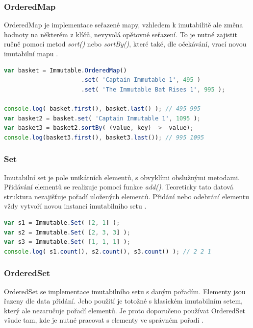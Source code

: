 \subsubsection{OrderedMap}
OrderedMap je implementace seřazené mapy, vzhledem k imutabilitě ale změna hodnoty na některém z klíčů, nevyvolá opětovné seřazení. To je nutné zajistit ručně pomocí metod \textit{sort()} nebo \textit{sortBy()}, které také, dle očekávání, vrací novou imutabilní mapu \cite{immutablejs} \cite{immutablejs_learn}.
\begin{lstlisting}[language=Javascript,caption={Ukázka práce s imutabilními seřazenými mapami v immutable.js}]
var basket = Immutable.OrderedMap()
                      .set( 'Captain Immutable 1', 495 )
                      .set( 'The Immutable Bat Rises 1', 995 );

console.log( basket.first(), basket.last() ); // 495 995
var basket2 = basket.set( 'Captain Immutable 1', 1095 );
var basket3 = basket2.sortBy( (value, key) -> -value); 
console.log(basket3.first(), basket3.last()); // 995 1095
\end{lstlisting}

\subsubsection{Set}
Imutabilní set je pole unikátních elementů, s obvyklími obslužnými metodami. Přidávání elementů se realizuje pomocí funkce \textit{add()}. Teoreticky tato datová struktura nezajišťuje pořadí uložených elementů. Přidání nebo odebrání elementu vždy vytvoří novou instanci imutabilního setu \cite{immutablejs} \cite{immutablejs_learn}.

\begin{lstlisting}[language=Javascript,caption={Ukázka práce s imutabilním objektem Set v immutable.js \cite{immutablejs}}] 
var s1 = Immutable.Set( [2, 1] );
var s2 = Immutable.Set( [2, 3, 3] );
var s3 = Immutable.Set( [1, 1, 1] );
console.log( s1.count(), s2.count(), s3.count() ); // 2 2 1
\end{lstlisting}

\subsubsection{OrderedSet}
OrderedSet se implementace imutabilního setu s daným pořadím. Elementy jsou řazeny dle data přidání. Jeho použití je totožné s klasickém imutabilním setem, který ale nezaručuje pořadí elementů. Je proto doporučeno používat OrderedSet všude tam, kde je nutné pracovat s elementy ve správném pořadí  \cite{immutablejs} \cite{immutablejs_learn}.


